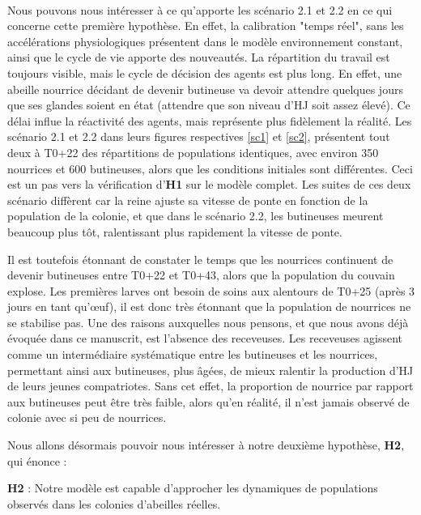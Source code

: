 		\paragraph{}
		Nous pouvons nous intéresser à ce qu'apporte les scénario 2.1 et 2.2 en ce qui concerne cette première hypothèse. En effet, la calibration "temps réel", sans les accélérations physiologiques présentent dans le modèle environnement constant, ainsi que le cycle de vie apporte des nouveautés. La répartition du travail est toujours visible, mais le cycle de décision des agents est plus long. En effet, une abeille nourrice décidant de devenir butineuse va devoir attendre quelques jours que ses glandes soient en état (attendre que son niveau d'HJ soit assez élevé). Ce délai influe la réactivité des agents, mais représente plus fidèlement la réalité. Les scénario 2.1 et 2.2 dans leurs figures respectives \ref{sc1} et \ref{sc2}, présentent tout deux à T0+22 des répartitions de populations identiques, avec environ 350 nourrices et 600 butineuses, alors que les conditions initiales sont différentes. Ceci est un pas vers la vérification d'\textbf{H1} sur le modèle complet. Les suites de ces deux scénario diffèrent car la reine ajuste sa vitesse de ponte en fonction de la population de la colonie, et que dans le scénario 2.2, les butineuses meurent beaucoup plus tôt, ralentissant plus rapidement la vitesse de ponte.
		
		Il est toutefois étonnant de constater le temps que les nourrices continuent de devenir butineuses entre T0+22 et T0+43, alors que la population du couvain explose. Les premières larves ont besoin de soins aux alentours de T0+25 (après 3 jours en tant qu'œuf), il est donc très étonnant que la population de nourrices ne se stabilise pas. Une des raisons auxquelles nous pensons, et que nous avons déjà évoquée dans ce manuscrit, est l'absence des receveuses. Les receveuses agissent comme un intermédiaire systématique entre les butineuses et les nourrices, permettant ainsi aux butineuses, plus âgées, de mieux ralentir la production d'HJ de leurs jeunes compatriotes. Sans cet effet, la proportion de nourrice par rapport aux butineuses peut être très faible, alors qu'en réalité, il n'est jamais observé de colonie avec si peu de nourrices.
		

		Nous allons désormais pouvoir nous intéresser à notre deuxième hypothèse, \textbf{H2}, qui énonce : 
		
		 \textbf{H2} : Notre modèle est capable d'approcher les dynamiques de populations observés dans les colonies d'abeilles réelles.
		 
